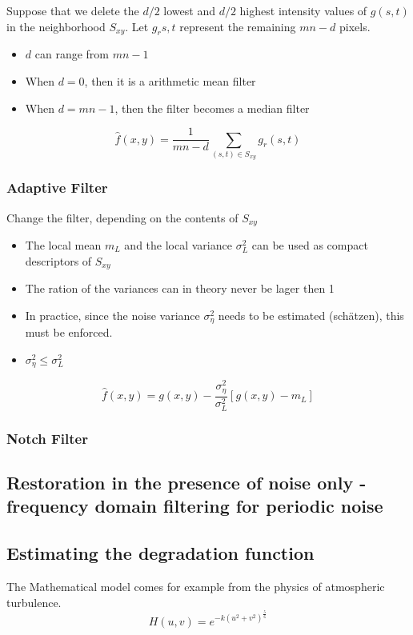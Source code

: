 Suppose that we delete the $d/2$ lowest and $d/2$ highest intensity values of $g(s,t)$ in the neighborhood $S_{xy}$. Let $g_r{s,t}$ represent the remaining $mn-d$ pixels.
\begin{itemize}
	\item $d$ can range from $mn-1$
	\item When $d=0$, then it is a arithmetic mean filter
	\item When $d=mn-1$, then the filter becomes a median filter
\end{itemize}
\begin{equation}
	\hat{f}(x,y)=\frac{1}{mn-d} \sum\limits_{(s,t)\in S_{xy}} g_r(s,t)
\end{equation}
\newpage

\subsubsection{Adaptive Filter }
Change the filter, depending on the contents of $S_{xy}$
\begin{itemize}
	\item The local mean $m_L$ and the local variance $\sigma_{L}^2$ can be used as compact descriptors of $S_{xy}$
	\item The ration of the variances can in theory never be lager then 1
	\item In practice, since the noise variance $\sigma_{\eta}^2$ needs to be estimated (schätzen), this must be enforced.
	\item $\sigma_{\eta}^2 \le \sigma_{L}^2$
\end{itemize}

\begin{equation}
	\hat{f}(x,y)=g(x,y) - \frac{\sigma_{\eta}^2}{\sigma_{L}^2} \left[g(x,y)-m_L \right]
\end{equation}

\subsubsection{Notch Filter }
\subsection{Restoration in the presence of noise only - frequency domain filtering for periodic noise }


\subsection{Estimating the degradation function }
The Mathematical model comes for example from the physics of atmospheric turbulence. 
\begin{equation}
	H(u,v) = e^{-k(u^2+v^2)^{\frac{5}{6}}}
\end{equation}

